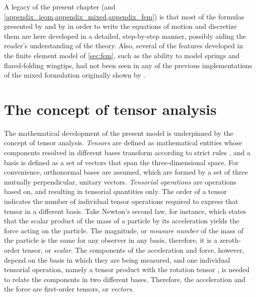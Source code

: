 \documentclass[12pt,a4paper,oneside,english]{abntex2} %
\begin{document}
A legacy of the present chapter (and \cref{appendix_ieom,appendix_mixed,appendix_fem}) is that most of the formulas presented by  and by  in order to write the equations of motion and discretize them are here developed in a detailed, step-by-step manner, possibly aiding the reader's understanding of the theory. Also, several of the features developed in the finite element model of \cref{sec:fem}, such as the ability to model springs and flared-folding wingtips, had not been seen in any of the previous implementations of the mixed formulation originally shown by .

\section{The concept of tensor analysis}
\label{sec:tensor_analysis}

The mathematical development of the present model is underpinned by the concept of tensor analysis.
\textit{Tensors} are defined as mathematical entities whose components
resolved in different bases transform according to strict rules \cite{bauchau2011flexible}, and a basis is defined as a set of vectors that span the three-dimensional space. For convenience, orthonormal bases are assumed, which are formed by a set of three mutually perpendicular, unitary vectors. \textit{Tensorial operations} are operations based on, and resulting in tensorial quantities only. The order of a tensor indicates the number of individual tensor operations required to express that tensor in a different basis. Take Newton's second law, for instance, which states that the scalar product of the mass of a particle by its acceleration yields the force acting on the particle. The magnitude, or \textit{measure number} of the mass of the particle is the same for any observer in any basis, therefore, it is a zeroth-order tensor, or \textit{scalar}. The components of the acceleration and force, however, depend on the basis in which they are being measured, and one individual tensorial operation, namely a tensor product with the rotation tensor \cite{bauchau2011flexible}, is needed to relate the components in two different bases. Therefore, the acceleration and the force are first-order tensors, or \textit{vectors}.
\end{document}
